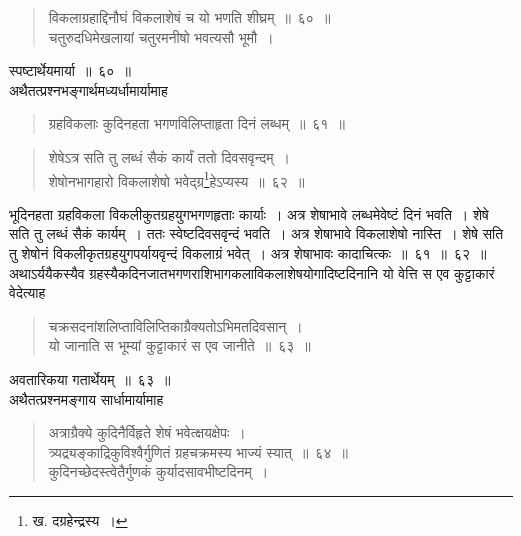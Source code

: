 \documentclass[11pt, openany]{book}
\begin{document}
\begin{quote}
{\ks विकलाग्रहाद्दिनौघं विकलाशेषं च यो भणति शीघ्रम्~॥~६०~॥\\
चतुरुदधिमेखलायां चतुरमनीषो भवत्यसौ भूमौ~।}
\end{quote}

\indent
स्पष्टार्थेयमार्या~॥~६०~॥\\

\indent
अथैतत्प्रश्नभङ्गार्थमध्यर्धामार्यामाह\textendash

\begin{quote}
{\ks ग्रहविकलाः कुदिनहता भगणविलिप्ताहृता दिनं लब्धम्~॥~६१~॥}
\end{quote}

\newpage
\thispagestyle{fancy}
\fancyhf{}

\begin{quote}
{\ks शेषेऽत्र सति तु लब्धं सैकं कार्यं ततो दिवसवृन्दम्~।\\
शेषोनभागहारो विकलाशेषो भवेद्ग्र\renewcommand\thefootnote{१}\footnote{ख. दग्रहेन्द्रस्य~।}हेऽप्यस्य~॥~६२~॥}
\end{quote}

\indent
भूदिनहता ग्रहविकला विकलीकुतग्रहयुगभगणहृताः कार्याः~। अत्र
शेषाभावे लब्धमेवेष्टं दिनं भवति~। शेषे सति तु लब्धं सैकं कार्यम्~। ततः
स्वेष्टदिवसवृन्दं भवति~। अत्र शेषाभावे विकलाशेषो नास्ति~। शेषे सति तु
शेषोनं विकलीकृतग्रहयुगपर्यायवृन्दं विकलाग्रं भवेत्~। अत्र शेषाभावः कादाचित्कः~॥~६१~॥~६२~॥\\

\indent
अथाऽर्ययैकस्यैव ग्रहस्यैकदिनजातभगणराशिभागकलाविकलाशेषयोगादिष्टदिनानि यो वेत्ति स एव कुट्टाकारं वेदेत्याह\textendash

\begin{quote}
{\ks चक्रसदनांशलिप्ताविलिप्तिकाग्रैक्यतोऽभिमतदिवसान्~।\\
यो जानाति स भूम्यां कुट्टाकारं स एव जानीते~॥~६३~॥}
\end{quote}

\indent
अवतारिकया गतार्थेयम्~॥~६३~॥\\

\indent
अथैतत्प्रश्नमङ्गाय सार्धामार्यामाह\textendash

\begin{quote}
{\ks अत्राग्रैक्ये कुदिनैर्विहृते शेषं भवेत्क्षयक्षेपः~।\\
त्र्यद्र्यङ्काद्रिकुविश्वैर्गुणितं ग्रहचक्रमस्य भाज्यं स्यात्~॥~६४~॥\\
कुदिनच्छेदस्त्वेतैर्गुणकं कुर्यादसावभीष्टदिनम्~।}
\end{quote}
\end{document}
